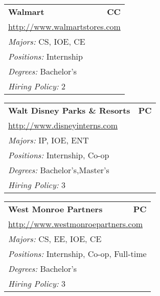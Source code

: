 \documentclass[twoside]{article}
\begin{document}
\begin{center}
\begin{multicols}{3}
\begin{FlushLeft}
\begin{minipage}{.9\columnwidth}
\end{minipage}
 
\begin{minipage}{.9\columnwidth}\begin{tabularx}{.95\columnwidth}{Xr}
                 {\Large\bf Walmart} & {\Large\bf CC}\\
    \multicolumn{2}{p{.95\columnwidth}}{\url{http://www.walmartstores.com}}\\
    \multicolumn{2}{p{.95\columnwidth}}{\emph{Majors:} CS, IOE, CE}\\
    \multicolumn{2}{p{.95\columnwidth}}{\emph{Positions:} Internship}\\
    \multicolumn{2}{p{.95\columnwidth}}{\emph{Degrees:} Bachelor's}\\
    \multicolumn{2}{p{.95\columnwidth}}{\emph{Hiring Policy:} 2}\\
    \end{tabularx}
    
\end{minipage}
 
\begin{minipage}{.9\columnwidth}\begin{tabularx}{.95\columnwidth}{Xr}
                 {\Large\bf Walt Disney Parks \& Resorts} & {\Large\bf PC}\\
    \multicolumn{2}{p{.95\columnwidth}}{\url{http://www.disneyinterns.com}}\\
    \multicolumn{2}{p{.95\columnwidth}}{\emph{Majors:} IP, IOE, ENT}\\
    \multicolumn{2}{p{.95\columnwidth}}{\emph{Positions:} Internship, Co-op}\\
    \multicolumn{2}{p{.95\columnwidth}}{\emph{Degrees:} Bachelor's,Master's}\\
    \multicolumn{2}{p{.95\columnwidth}}{\emph{Hiring Policy:} 3}\\
    \end{tabularx}
    
\end{minipage}
 
\begin{minipage}{.9\columnwidth}\begin{tabularx}{.95\columnwidth}{Xr}
                 {\Large\bf West Monroe Partners} & {\Large\bf PC}\\
    \multicolumn{2}{p{.95\columnwidth}}{\url{http://www.westmonroepartners.com}}\\
    \multicolumn{2}{p{.95\columnwidth}}{\emph{Majors:} CS, EE, IOE, CE}\\
    \multicolumn{2}{p{.95\columnwidth}}{\emph{Positions:} Internship, Co-op, Full-time}\\
    \multicolumn{2}{p{.95\columnwidth}}{\emph{Degrees:} Bachelor's}\\
    \multicolumn{2}{p{.95\columnwidth}}{\emph{Hiring Policy:} 3}\\
    \end{tabularx}
    

\end{minipage}
\end{FlushLeft}
\end{multicols}
\end{center}
\end{document}
